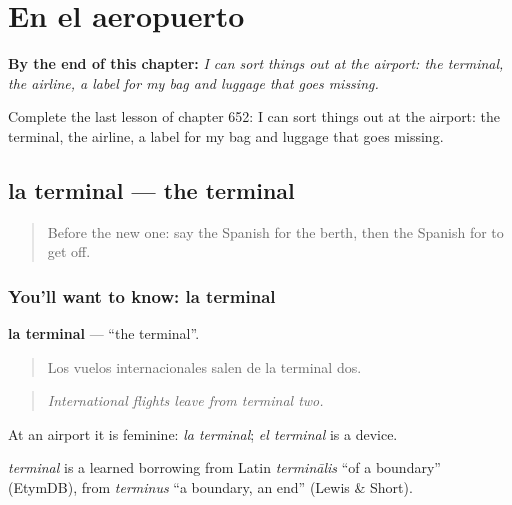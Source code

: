 
\chapter{En el aeropuerto}
\label{ch:es-en-el-aeropuerto}

\begin{chapteropening}
\textbf{By the end of this chapter:} \emph{I can sort things out at the airport: the terminal, the airline, a label for my bag and luggage that goes missing.}

Complete the last lesson of chapter 652: I can sort things out at the airport: the terminal, the airline, a label for my bag and luggage that goes missing.
\end{chapteropening}

\section[la terminal]{la terminal — the terminal}

\label{lesson:ES-C652-terminal}



\begin{quote}
Before the new one: say the Spanish for the berth, then the Spanish for to get off.
\end{quote}

\subsection*{You'll want to know: la terminal}
\textbf{la terminal} — \textquotedblleft{}the terminal\textquotedblright{}.

\begin{quote}
Los vuelos internacionales salen de la terminal dos.
\end{quote}

\begin{quote}
\emph{International flights leave from terminal two.}
\end{quote}

At an airport it is feminine: \emph{la terminal}; \emph{el terminal} is a device.

\begin{cousinweb}
\emph{terminal} is a learned borrowing from Latin \emph{terminālis} \textquotedblleft{}of a boundary\textquotedblright{} (EtymDB), from \emph{terminus} \textquotedblleft{}a boundary, an end\textquotedblright{} (Lewis \& Short).
\end{cousinweb}

